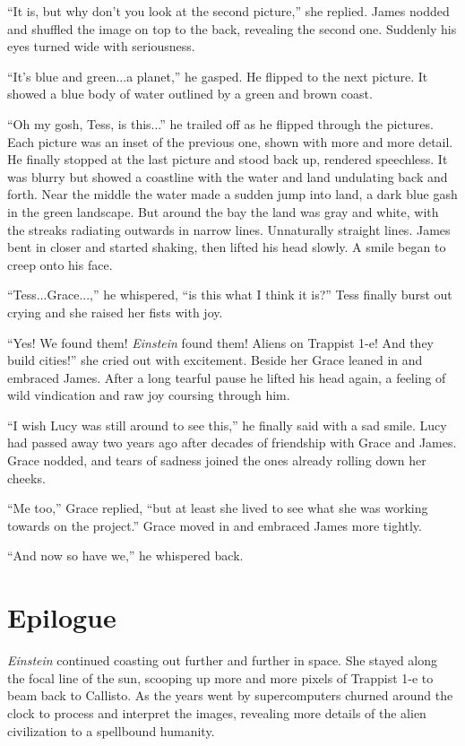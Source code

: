 \documentclass[openany, 12pt]{book} %
\begin{document}
``It is, but why don't you look at the second picture,'' she replied. James nodded and shuffled the image on top to the back, revealing the second one. Suddenly his eyes turned wide with seriousness.

``It's blue and green...a planet,'' he gasped. He flipped to the next picture. It showed a blue body of water outlined by a green and brown coast.

``Oh my gosh, Tess, is this...'' he trailed off as he flipped through the pictures. Each picture was an inset of the previous one, shown with more and more detail. He finally stopped at the last picture and stood back up, rendered speechless. It was blurry but showed a coastline with the water and land undulating back and forth. Near the middle the water made a sudden jump into land, a dark blue gash in the green landscape. But around the bay the land was gray and white, with the streaks radiating outwards in narrow lines. Unnaturally straight lines. James bent in closer and started shaking, then lifted his head slowly. A smile began to creep onto his face.

``Tess...Grace...,'' he whispered, ``is this what I think it is?'' Tess finally burst out crying and she raised her fists with joy.

``Yes! We found them! \textit{Einstein} found them! Aliens on Trappist 1-e! And they build cities!'' she cried out with excitement. Beside her Grace leaned in and embraced James. After a long tearful pause he lifted his head again, a feeling of wild vindication and raw joy coursing through him.

``I wish Lucy was still around to see this,'' he finally said with a sad smile. Lucy had passed away two years ago after decades of friendship with Grace and James. Grace nodded, and tears of sadness joined the ones already rolling down her cheeks.

``Me too,'' Grace replied, ``but at least she lived to see what she was working towards on the project.'' Grace moved in and embraced James more tightly.

``And now so have we,'' he whispered back.


\chapter*{Epilogue}

\textit{Einstein} continued coasting out further and further in space. She stayed along the focal line of the sun, scooping up more and more pixels of Trappist 1-e to beam back to Callisto. As the years went by supercomputers churned around the clock to process and interpret the images, revealing more details of the alien civilization to a spellbound humanity.
\end{document}
